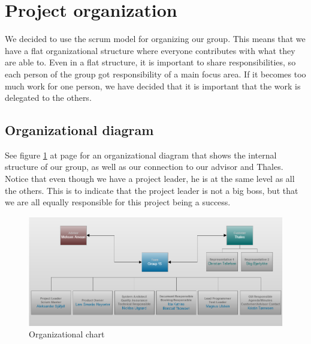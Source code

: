 

\section{Project organization}
We decided to use the scrum model for organizing our group. This means that we have a flat organizational structure where everyone contributes with what they are able to. Even in a flat structure, it is important to share responsibilities, so each person of the group got responsibility of a main focus area. If it becomes too much work for one person, we have decided that it is important that the work is delegated to the others.

\subsection{Organizational diagram}
See figure \ref{fig:organizationalchart} at page \pageref{fig:organizationalchart} for an organizational diagram that shows the internal structure of our group, as well as our connection to our advisor and Thales. Notice that even though we have a project leader, he is at the same level as all the others. This is to indicate that the project leader is not a big boss, but that we are all equally responsible for this project being a success.
\begin{figure}[hbt]
\begin{center}
\includegraphics[width=\textwidth]{Organizational_Chart_v2}
\caption{Organizational chart} \label{fig:organizationalchart}
\end{center}
\end{figure}

\newpage

